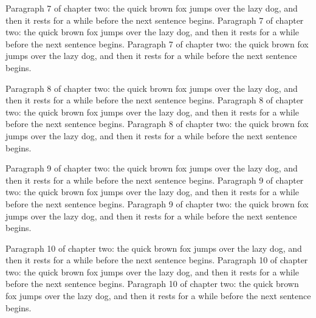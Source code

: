 Paragraph 7 of chapter two: the quick brown fox jumps over the lazy dog, and then it rests for a while before the next sentence begins. Paragraph 7 of chapter two: the quick brown fox jumps over the lazy dog, and then it rests for a while before the next sentence begins. Paragraph 7 of chapter two: the quick brown fox jumps over the lazy dog, and then it rests for a while before the next sentence begins. 

Paragraph 8 of chapter two: the quick brown fox jumps over the lazy dog, and then it rests for a while before the next sentence begins. Paragraph 8 of chapter two: the quick brown fox jumps over the lazy dog, and then it rests for a while before the next sentence begins. Paragraph 8 of chapter two: the quick brown fox jumps over the lazy dog, and then it rests for a while before the next sentence begins. 

Paragraph 9 of chapter two: the quick brown fox jumps over the lazy dog, and then it rests for a while before the next sentence begins. Paragraph 9 of chapter two: the quick brown fox jumps over the lazy dog, and then it rests for a while before the next sentence begins. Paragraph 9 of chapter two: the quick brown fox jumps over the lazy dog, and then it rests for a while before the next sentence begins. 

Paragraph 10 of chapter two: the quick brown fox jumps over the lazy dog, and then it rests for a while before the next sentence begins. Paragraph 10 of chapter two: the quick brown fox jumps over the lazy dog, and then it rests for a while before the next sentence begins. Paragraph 10 of chapter two: the quick brown fox jumps over the lazy dog, and then it rests for a while before the next sentence begins. 


